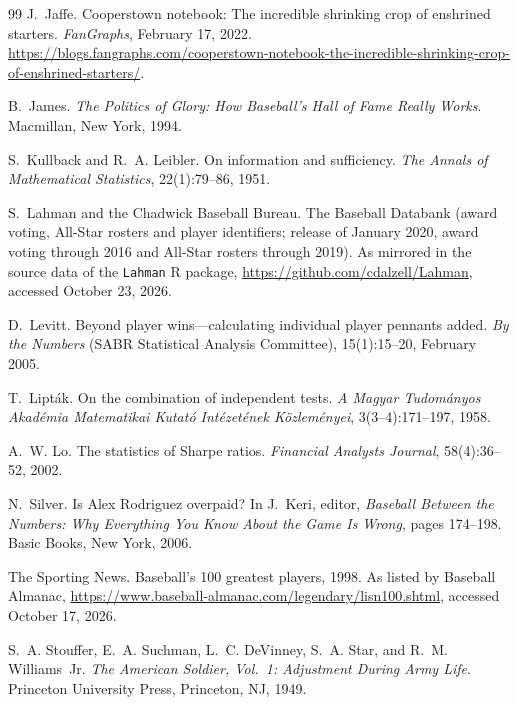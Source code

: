 \documentclass[11pt,letterpaper]{article}
\theoremstyle{plain}
\theoremstyle{definition}
\theoremstyle{remark}
\begin{document}
\begin{thebibliography}{99}
J.~Jaffe.
\newblock Cooperstown notebook: The incredible shrinking crop of enshrined starters.
\newblock \emph{FanGraphs}, February 17, 2022. \url{https://blogs.fangraphs.com/cooperstown-notebook-the-incredible-shrinking-crop-of-enshrined-starters/}.

B.~James.
\newblock \emph{The Politics of Glory: How Baseball's Hall of Fame Really Works}.
\newblock Macmillan, New York, 1994.

S.~Kullback and R.~A. Leibler.
\newblock On information and sufficiency.
\newblock \emph{The Annals of Mathematical Statistics}, 22(1):79--86, 1951.

S.~Lahman and the Chadwick Baseball Bureau.
\newblock The Baseball Databank (award voting, All-Star rosters and player identifiers; release of January 2020, award voting through 2016 and All-Star rosters through 2019).
\newblock As mirrored in the source data of the \texttt{Lahman} R package, \url{https://github.com/cdalzell/Lahman}, accessed October 23, 2026.

D.~Levitt.
\newblock Beyond player wins---calculating individual player pennants added.
\newblock \emph{By the Numbers} (SABR Statistical Analysis Committee), 15(1):15--20, February 2005.

T.~Lipt\'{a}k.
\newblock On the combination of independent tests.
\newblock \emph{A Magyar Tudom\'{a}nyos Akad\'{e}mia Matematikai Kutat\'{o} Int\'{e}zet\'{e}nek K\"{o}zlem\'{e}nyei}, 3(3--4):171--197, 1958.

A.~W. Lo.
\newblock The statistics of Sharpe ratios.
\newblock \emph{Financial Analysts Journal}, 58(4):36--52, 2002.

N.~Silver.
\newblock Is Alex Rodriguez overpaid?
\newblock In J.~Keri, editor, \emph{Baseball Between the Numbers: Why Everything You Know About the Game Is Wrong}, pages 174--198. Basic Books, New York, 2006.

{The Sporting News}.
\newblock Baseball's 100 greatest players, 1998.
\newblock As listed by Baseball Almanac, \url{https://www.baseball-almanac.com/legendary/lisn100.shtml}, accessed October 17, 2026.

S.~A. Stouffer, E.~A. Suchman, L.~C. DeVinney, S.~A. Star, and R.~M. Williams~Jr.
\newblock \emph{The American Soldier, Vol.~1: Adjustment During Army Life}.
\newblock Princeton University Press, Princeton, NJ, 1949.


\end{thebibliography}
\end{document}
